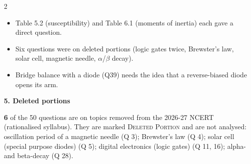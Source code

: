 \begin{multicols}{2}
{\begin{itemize}[leftmargin=1em,nosep]
\item Table 5.2 (susceptibility) and Table 6.1 (moments of inertia) each gave a direct question.
\item Six questions were on deleted portions (logic gates twice, Brewster's law, solar cell, magnetic needle, $\alpha$/$\beta$ decay).
\item Bridge balance with a diode (Q39) needs the idea that a reverse-biased diode opens its arm.
\end{itemize}}\par\medskip
\textbf{\color{crimson}5. Deleted portions}\par\smallskip
\textbf{6} of the 50 questions are on topics removed from the 2026-27 NCERT (rationalised syllabus). They are marked \textsc{Deleted Portion} and are not analysed: oscillation period of a magnetic needle (Q 3); Brewster's law (Q 4); solar cell (special purpose diodes) (Q 5); digital electronics (logic gates) (Q 11, 16); alpha- and beta-decay (Q 28).\par
\end{multicols}


